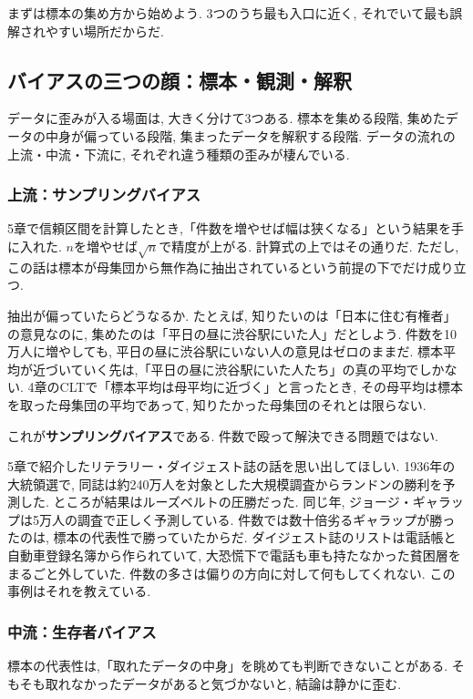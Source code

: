 まずは標本の集め方から始めよう.
3つのうち最も入口に近く, それでいて最も誤解されやすい場所だからだ.


\subsection{バイアスの三つの顔：標本・観測・解釈}

データに歪みが入る場面は, 大きく分けて3つある.
標本を集める段階, 集めたデータの中身が偏っている段階, 集まったデータを解釈する段階.
データの流れの上流・中流・下流に, それぞれ違う種類の歪みが棲んでいる.

\subsubsection*{上流：サンプリングバイアス}

5章で信頼区間を計算したとき,「件数を増やせば幅は狭くなる」という結果を手に入れた.
$n$を増やせば$\sqrt{n}$で精度が上がる. 計算式の上ではその通りだ.
ただし, この話は標本が母集団から無作為に抽出されているという前提の下でだけ成り立つ.

抽出が偏っていたらどうなるか.
たとえば, 知りたいのは「日本に住む有権者」の意見なのに, 集めたのは「平日の昼に渋谷駅にいた人」だとしよう.
件数を10万人に増やしても, 平日の昼に渋谷駅にいない人の意見はゼロのままだ.
標本平均が近づいていく先は,「平日の昼に渋谷駅にいた人たち」の真の平均でしかない.
4章のCLTで「標本平均は母平均に近づく」と言ったとき, その母平均は標本を取った母集団の平均であって, 知りたかった母集団のそれとは限らない.

これが\textbf{サンプリングバイアス}である. 件数で殴って解決できる問題ではない.

5章で紹介したリテラリー・ダイジェスト誌の話を思い出してほしい.
1936年の大統領選で, 同誌は約240万人を対象とした大規模調査からランドンの勝利を予測した.
ところが結果はルーズベルトの圧勝だった. 同じ年, ジョージ・ギャラップは5万人の調査で正しく予測している.
件数では数十倍劣るギャラップが勝ったのは, 標本の代表性で勝っていたからだ.
ダイジェスト誌のリストは電話帳と自動車登録名簿から作られていて, 大恐慌下で電話も車も持たなかった貧困層をまるごと外していた.
件数の多さは偏りの方向に対して何もしてくれない. この事例はそれを教えている.

\subsubsection*{中流：生存者バイアス}

標本の代表性は,「取れたデータの中身」を眺めても判断できないことがある.
そもそも取れなかったデータがあると気づかないと, 結論は静かに歪む.

